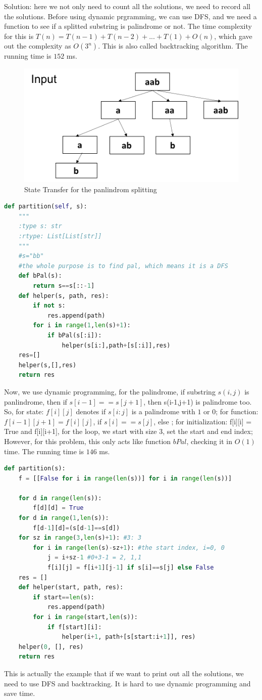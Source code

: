 \documentclass[../main.tex]{subfiles}
\begin{document}
\begin{enumerate}
Solution: here we not only need to count all the solutions, we need to record all the solutions. Before using dynamic prgramming, we can use DFS, and we need a function to see if a splitted substring is palindrome or not. The time complexity for this is $T(n) = T(n-1)+T(n-2)+...+T(1)+O(n)$, which gave out the complexity as $O(3^n)$. This is also called backtracking algorithm.  The running time is $152$ ms.
\begin{figure}[h]
    \centering
    \includegraphics[width = 0.5\columnwidth]{fig/palindromPartition.png}
    \caption{State Transfer for the panlindrom splitting}
    \label{fig:my_label}
\end{figure}
\begin{lstlisting}[language = Python]
def partition(self, s):
    """
    :type s: str
    :rtype: List[List[str]]
    """
    #s="bb"
    #the whole purpose is to find pal, which means it is a DFS
    def bPal(s):
        return s==s[::-1]
    def helper(s, path, res):
        if not s: 
            res.append(path)
        for i in range(1,len(s)+1):
            if bPal(s[:i]):
                helper(s[i:],path+[s[:i]],res)
    res=[]
    helper(s,[],res)
    return res
\end{lstlisting}
Now, we use dynamic programming, for the palindrome, if substring $s(i,j)$ is panlindrome, then if $s[i-1] == s[j+1]$, then s(i-1,j+1) is palindrome too. So, for state: $f[i][j]$ denotes if $s[i:j]$ is a palindrome with $1$ or $0$; for function: $f[i-1][j+1] = f[i][j]$, if $s[i]==s[j]$, else ; for initialization: f[i][i] = True and f[i][i+1], for the loop, we start with size $3$, set the start and end index; However, for this problem, this only acts like function $bPal$, checking it in $O(1)$ time. The running time is $146$ ms.
\begin{lstlisting}[language = Python]
def partition(s):
    f = [[False for i in range(len(s))] for i in range(len(s))]

    for d in range(len(s)):
        f[d][d] = True
    for d in range(1,len(s)):
        f[d-1][d]=(s[d-1]==s[d])
    for sz in range(3,len(s)+1): #3: 3
        for i in range(len(s)-sz+1): #the start index, i=0, 0 
            j = i+sz-1 #0+3-1 = 2, 1,1
            f[i][j] = f[i+1][j-1] if s[i]==s[j] else False
    res = []  
    def helper(start, path, res):
        if start==len(s): 
            res.append(path)
        for i in range(start,len(s)):
            if f[start][i]:
                helper(i+1, path+[s[start:i+1]], res)
    helper(0, [], res)
    return res
\end{lstlisting}
This is actually the example that if we want to print out all the solutions, we need to use DFS and backtracking. It is hard to use dynamic programming and save time.
\end{enumerate}
\end{document}

